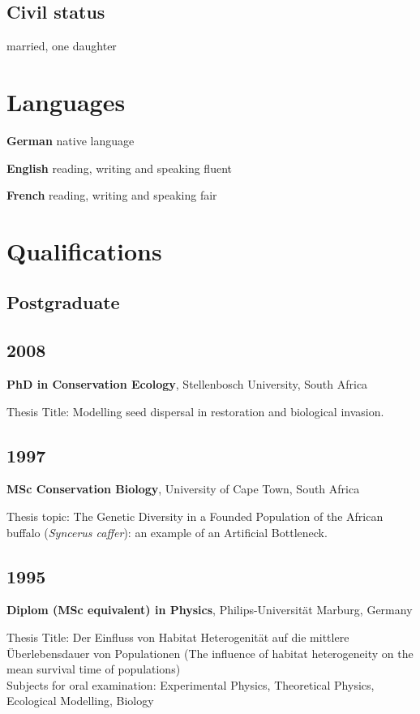 \documentclass[a4paper]{article}
\begin{document}
\subsection{Civil status}

married, one daughter

\section{Languages}

\textbf{German} native language

\textbf{English} reading, writing and speaking fluent

\textbf{French} reading, writing and speaking fair


\section{Qualifications}

\subsection{Postgraduate}


\subsection{2008}

\textbf{PhD in Conservation Ecology}, Stellenbosch University, South Africa

Thesis Title: Modelling seed dispersal in restoration and biological
invasion.

\subsection{1997}

\textbf{MSc Conservation Biology}, University of Cape Town, South Africa

Thesis topic: The Genetic Diversity in a Founded Population of the
African buffalo (\emph{Syncerus caffer}): an example of an Artificial
Bottleneck.

\subsection{1995}

\textbf{Diplom (MSc equivalent) in Physics}, Philips-Universität Marburg, Germany

Thesis Title: Der Einfluss von Habitat Heterogenität auf die mittlere
Überlebensdauer von Populationen (The influence of habitat heterogeneity
on the mean survival time of populations)\\
Subjects for oral examination: Experimental Physics, Theoretical
Physics, Ecological Modelling, Biology
\end{document}
